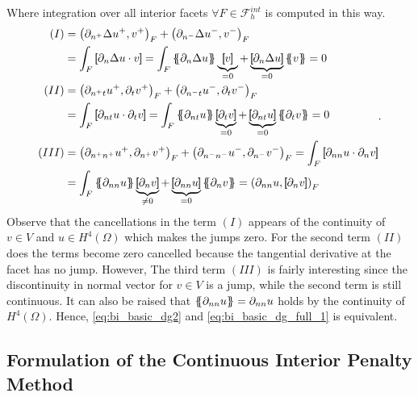 Where integration over all interior facets $ \forall F \in \mathcal{F}_{h}^{int}$ is computed in this way.
\begin{equation*}
    \begin{split}
        (I) &  =    \left(\partial _{n^{+}} \Delta  u^{+} ,v^{+}\right)_{F} +
        \left(\partial _{n^{-}} \Delta  u^{-} ,v^{-}\right)_{F}  \\
        & =   \int_{F}^{}
        \jump{ \partial _{n} \Delta  u \cdot v } =
         \int_{F}^{}
         \mean{ \partial _{n} \Delta  u } \underbrace{\jump{ v }}_{= 0}    + \underbrace{\jump{ \partial _{n} \Delta  u
         }}_{= 0}    \mean{ v } = 0 \\
        (II) &  =     \left(\partial _{n^{+}t} u^{+}, \partial_{t} v^{+}
        \right)_{F} +  \left(\partial _{n^{-}t} u^{-}, \partial_{t} v^{-}
\right)_{F}   \\
&  =   \int_{F}^{}
        \jump{ \partial _{nt} u \cdot  \partial_{t} v } =
         \int_{F}^{}
         \mean{ \partial _{nt} u    } \underbrace{\jump{ \partial_{t} v }  }_{= 0}    + \underbrace{\jump{ \partial
                 _{nt}  u
         }}_{= 0}    \mean{ \partial _{t}v }  = 0\\
        (III) &  =     \left(\partial _{n^{+}n^{+}} u^{+}, \partial_{n^{+}} v^{+} \right)_{F} +  \left(\partial _{n^{-}n^{-}} u^{-}, \partial_{n^{-}} v^{-} \right)_{F}    =    \int_{F}^{} \jump{ \partial _{nn} u \cdot  \partial_{n} v }  \\
        & = \int_{F}^{}
        \mean{ \partial _{nn} u    } \underbrace{\jump{ \partial_{n} v }  }_{\neq 0}    + \underbrace{\jump{ \partial
                 _{nn}  u
         }}_{= 0}    \mean{ \partial _{n}v }   =  \left( \partial _{nn} u, \jump{ \partial_{n} v } \right)_{F}   \end{split}
.\end{equation*}
Observe that the cancellations in the term $(I)$ appears of the continuity of $v\in V $ and $u\in H^{4}( \Omega ) $ which makes the jumps zero. For the second term $(II)$ does the terms become zero cancelled because the tangential
derivative at the facet has no jump. However, The third term $(III)$  is fairly interesting since the discontinuity in
normal vector for $v \in V$ is a jump, while the second term is still continuous. It can also be raised that $\left\{\!\!\left\{
\partial _{nn} u \right\}\!\!\right\} = \partial _{nn} u  $ holds by the continuity of $H^{4}( \Omega  ) $. Hence,
\eqref{eq:bi_basic_dg2} and \eqref{eq:bi_basic_dg_full_1} is equivalent.

\subsection{Formulation of the Continuous Interior Penalty Method}%
\label{sub:formulation_of_continious_interior_penalty_method}


